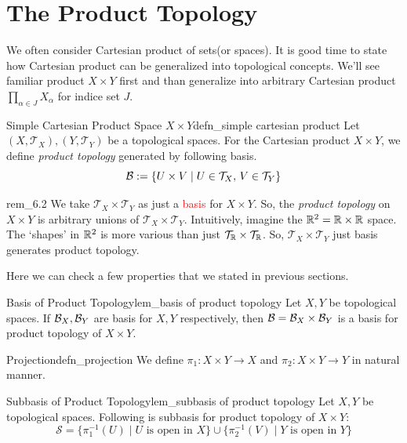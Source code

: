 \documentclass[12pt, a4paper, twoside]{article}
\newcommand{\CS}{{\mathcal {S}}} \newcommand{\CT}{{\mathcal {T}}}
\theoremstyle{plain}
\begin{document}
\newpage 

\section{The Product Topology}

We often consider Cartesian product of sets(or spaces). It is good time to state how Cartesian product can be generalized into topological concepts. 
We'll see familiar product $X \times Y$ first and than generalize into arbitrary Cartesian product $\prod_{\alpha \in J} X_\alpha$ for indice set $J$. 

\begin{defn}{Simple Cartesian Product Space $X \times Y$}{defn_simple cartesian product}
    Let $(X, \CT_X), (Y, \CT_Y)$ be a topological spaces. For the Cartesian product $X \times Y$, 
    we define \textit{product topology} generated by following basis. 
    \[\CB := \{U \times V \mid U \in \CT_X, \, V \in \CT_Y\}\]
\end{defn}

\begin{rem}{}{rem_6.2}
    We take $\CT_X \times \CT_Y$ as just a \textcolor{red}{basis} for $X \times Y$. 
    So, the \textit{product topology} on $X \times Y$ is arbitrary unions of $\CT_X \times \CT_Y$. 
    Intuitively, imagine the ${\mathbb {R}}^2 = {\mathbb {R}} \times {\mathbb {R}}$ space. 
    The \lq shapes' in ${\mathbb {R}}^2$ is more various than just $\CT_\BR \times \CT_\BR$. So, $\CT_X \times \CT_Y$ just basis generates product topology. 
\end{rem}

Here we can check a few properties that we stated in previous sections. 

\begin{lem}{Basis of Product Topology}{lem_basis of product topology}
    Let $X, Y$ be topological spaces. If ${\mathcal {B}}_X, {\mathcal {B}}_Y$ are basis for $X, Y$ respectively, 
    then ${\mathcal {B}} = {\mathcal {B}}_X \times {\mathcal {B}}_Y$ is a basis for product topology of $X \times Y$. 
\end{lem}

\begin{defn}{Projection}{defn_projection}
    We define $\pi_1: X \times Y \rightarrow X$ and $\pi_2: X \times Y \rightarrow Y$ in natural manner. 
\end{defn}

\begin{lem}{Subbasis of Product Topology}{lem_subbasis of product topology}
    Let $X, Y$ be topological spaces. Following is subbasis for product topology of $X \times Y$: 
    \[\CS = \{\pi_1^{-1}(U) \mid U \text{ is open in $X$}\} \cup \{\pi_2^{-1}(V) \mid Y \text{ is open in $Y$}\}\]
\end{lem}
\end{document}

